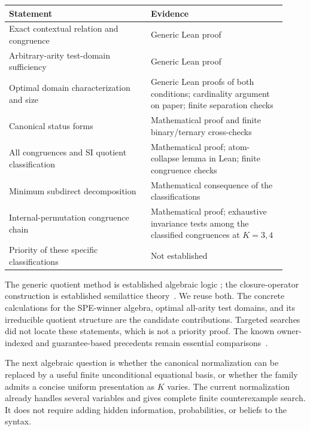 \documentclass[11pt]{article}
\begin{document}
\begin{center}\small
\begin{tabular}{@{}p{0.47\linewidth}p{0.45\linewidth}@{}}
\toprule
Statement & Evidence\\\midrule
Exact contextual relation and congruence & Generic Lean proof\\
Arbitrary-arity test-domain sufficiency & Generic Lean proof\\
Optimal domain characterization and size & Generic Lean proofs of both conditions; cardinality argument on paper; finite separation checks\\
Canonical status forms & Mathematical proof and finite binary/ternary cross-checks\\
All congruences and SI quotient classification & Mathematical proof; atom-collapse lemma in Lean; finite congruence checks\\
Minimum subdirect decomposition & Mathematical consequence of the classifications\\
Internal-permutation congruence chain & Mathematical proof; exhaustive invariance tests among the classified congruences at $K=3,4$\\
Priority of these specific classifications & Not established\\\bottomrule
\end{tabular}
\end{center}

The generic quotient method is established algebraic logic
\cite{Font1993}; the closure-operator construction is established
semilattice theory~\cite{Crapo1967}. We reuse both. The concrete
calculations for the SPE-winner algebra, optimal all-arity test domains,
and its irreducible quotient structure are the candidate contributions.
Targeted searches did not locate these statements, which is not a
priority proof. The known owner-indexed and guarantee-based precedents
remain essential comparisons~\cite{Abramsky2007,OldeLoohuisVenema2010}.

The next algebraic question is whether the canonical normalization can
be replaced by a useful finite unconditional equational basis, or
whether the family admits a concise uniform presentation as $K$ varies.
The current normalization already handles several variables and gives
complete finite counterexample search. It does not require adding hidden
information, probabilities, or beliefs to the syntax.



\end{document}
